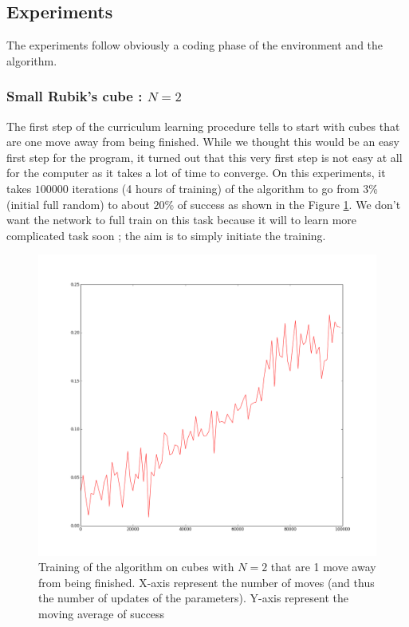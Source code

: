 \documentclass{article} %
\begin{document}
\subsection{Experiments}
The experiments follow obviously a coding phase of the environment and the algorithm.

\subsubsection{Small Rubik's cube : $N=2$}
The first step of the curriculum learning procedure tells to start with cubes that are one move away from being finished. While we thought this would be an easy first step for the program, it turned out that this very first step is not easy at all for the computer as it takes a lot of time to converge. On this experiments, it takes $100000$ iterations (4 hours of training) of the algorithm to go from $3$\% (initial full random) to about $20$\% of success as shown in the Figure \ref{firstfigure}. We don't want the network to full train on this task because it will to learn more complicated task soon ; the aim is to simply initiate the training.

\begin{figure}[h]
\begin{center}
   \includegraphics[scale=0.3]{firstfigure.png}
   \caption{\label{firstfigure} Training of the algorithm on cubes with $N=2$ that are 1 move away from being finished. X-axis represent the number of moves (and thus the number of updates of the parameters). Y-axis represent the moving average of success}
   \end{center}
\end{figure}
\end{document}
